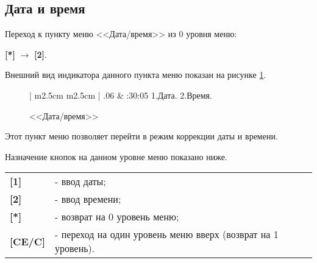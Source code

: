 \subsection{Дата и время}

Переход к пункту меню <<Дата/время>> из 0 уровня меню: 

\textbf{[*]} $\rightarrow$ \textbf{[2]}.

Внешний вид индикатора данного пункта меню показан на рисунке \ref{fig:dateTime}.
 
 \begin{figure}[H]
 	\centering
 	
	\begin{tabular}{| m{2.5cm}  m{2.5cm} |}
		.06	& :30:05	\tabularnewline 
		 {1.Дата.} 		\tabularnewline
		 {2.Время.} 	\tabularnewline 
		 {}				\tabularnewline 
		\lasthline
	\end{tabular} 
	
	\caption{<<Дата/время>>}
	\label{fig:dateTime}
\end{figure}

Этот пункт меню позволяет перейти в режим коррекции даты и времени.

Назначение кнопок на данном уровне меню показано ниже.

\begin{center}
	\begin{tabular}{p{2cm} p{15cm}}
		\textbf{[1]} & - ввод даты;					\tabularnewline 
		\textbf{[2]} & - ввод времени;				\tabularnewline 
		\textbf{[*]} & - возврат на 0 уровень меню; \tabularnewline
		\textbf{[CE/C]} & - переход на один уровень меню вверх (возврат на 1 уровень).	\tabularnewline				
	\end{tabular} 
\end{center}